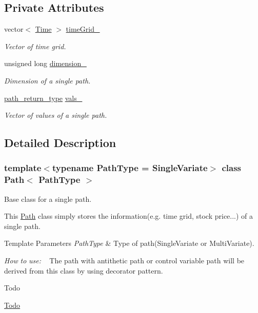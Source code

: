 \subsection*{Private Attributes}
\begin{DoxyCompactItemize}
\item 
vector$<$ \hyperlink{_name_def_8h_ac2d3e0ba793497bcca555c7c2cf64ff3}{Time} $>$ \hyperlink{class_path_a23350d9575ae171881cd45dc1ce2a701}{time\+Grid\+\_\+}
\begin{DoxyCompactList}\small\item\em Vector of time grid. \end{DoxyCompactList}\item 
unsigned long \hyperlink{class_path_a1011b18bd2dc22cc4b2151db076fb6f5}{dimension\+\_\+}
\begin{DoxyCompactList}\small\item\em Dimension of a single path. \end{DoxyCompactList}\item 
\hyperlink{class_path_a3b1c34a87f7867f6fed2e0a33f801e7d}{path\+\_\+return\+\_\+type} \hyperlink{class_path_a6f90f314a504ea1c9828dd2aa999f6ff}{vals\+\_\+}
\begin{DoxyCompactList}\small\item\em Vector of values of a single path. \end{DoxyCompactList}\end{DoxyCompactItemize}


\subsection{Detailed Description}
\subsubsection*{template$<$typename Path\+Type = Single\+Variate$>$\newline
class Path$<$ Path\+Type $>$}

Base class for a single path. 

This \hyperlink{class_path}{Path} class simply stores the information(e.\+g. time grid, stock price...) of a single path. 
\begin{DoxyTemplParams}{Template Parameters}
{\em Path\+Type} & Type of path(\+Single\+Variate or Multi\+Variate).\\
\hline
\end{DoxyTemplParams}
{\itshape How} {\itshape to} {\itshape use\+:} ~\newline
The path with antithetic path or control variable path will be derived from this class by using decorator pattern.\begin{DoxyRefDesc}{Todo}
\item[\hyperlink{todo__todo000001}{Todo}]\end{DoxyRefDesc}


